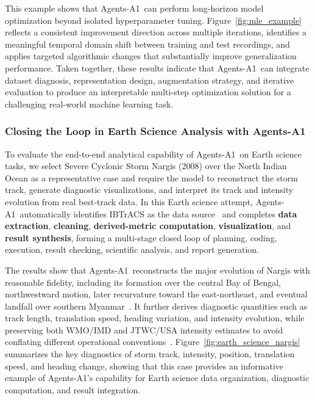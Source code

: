 \documentclass{llmxive}
\providecommand{\ProjectName}{Agents-A1}
\begin{document}
This example shows that \ProjectName~can perform long-horizon model optimization beyond isolated hyperparameter tuning. Figure~\ref{fig:mle_example} reflects a consistent improvement direction across multiple iterations, identifies a meaningful temporal domain shift between training and test recordings, and applies targeted algorithmic changes that substantially improve generalization performance. Taken together, these results indicate that \ProjectName~can integrate dataset diagnosis, representation design, augmentation strategy, and iterative evaluation to produce an interpretable multi-step optimization solution for a challenging real-world machine learning task.


\subsubsection{Closing the Loop in Earth Science Analysis with \ProjectName}
\label{earth_science:example}

To evaluate the end-to-end analytical capability of \ProjectName~on Earth science tasks, we select Severe Cyclonic Storm Nargis (2008) over the North Indian Ocean as a representative case and require the model to reconstruct the storm track, generate diagnostic visualizations, and interpret its track and intensity evolution from real best-track data. In this Earth science attempt, \ProjectName~automatically identifies IBTrACS as the data source~\cite{knapp2010ibtracs,gahtan2024ibtracs} and completes \textbf{data extraction}, \textbf{cleaning}, \textbf{derived-metric computation}, \textbf{visualization}, and \textbf{result synthesis}, forming a multi-stage closed loop of planning, coding, execution, result checking, scientific analysis, and report generation.

The results show that \ProjectName~reconstructs the major evolution of Nargis with reasonable fidelity, including its formation over the central Bay of Bengal, northwestward motion, later recurvature toward the east-northeast, and eventual landfall over southern Myanmar~\cite{jtwc2008atcr}. It further derives diagnostic quantities such as track length, translation speed, heading variation, and intensity evolution, while preserving both WMO/IMD and JTWC/USA intensity estimates to avoid conflating different operational conventions~\cite{ibtracs2025columns}. Figure~\ref{fig:earth_science_nargis} summarizes the key diagnostics of storm track, intensity, position, translation speed, and heading change, showing that this case provides an informative example of \ProjectName's capability for Earth science data organization, diagnostic computation, and result integration.
\end{document}
